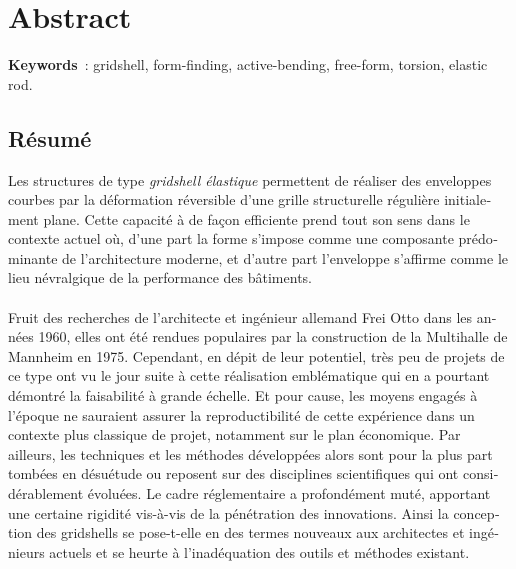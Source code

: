 
\cleardoublepage
\chapter*{Abstract}
\textbf{Keywords}~: gridshell, form-finding, active-bending, free-form, torsion, elastic rod.
\begin{otherlanguage}{french}
\cleardoublepage
\chapter*{Résumé}
Les structures de type \emph{gridshell élastique} permettent de réaliser des enveloppes courbes par la déformation réversible d'une grille structurelle régulière initialement plane. Cette capacité à  de façon efficiente prend tout son sens dans le contexte actuel où, d’une part la forme s'impose comme une composante prédominante de l'architecture moderne, et d’autre part l'enveloppe s'affirme comme le lieu névralgique de la performance des bâtiments.
\\
\\
Fruit des recherches de l'architecte et ingénieur allemand Frei Otto dans les années 1960, elles ont été rendues populaires par la construction de la Multihalle de Mannheim en 1975. Cependant, en dépit de leur potentiel, très peu de projets de ce type ont vu le jour suite à cette réalisation emblématique qui en a pourtant démontré la faisabilité à grande échelle. Et pour cause, les moyens engagés à l'époque ne sauraient assurer la reproductibilité de cette expérience dans un contexte plus classique de projet, notamment sur le plan économique. Par ailleurs, les techniques et les méthodes développées alors sont pour la plus part tombées en désuétude ou reposent sur des disciplines scientifiques qui ont considérablement évoluées. Le cadre réglementaire a profondément muté, apportant une certaine rigidité vis-à-vis de la pénétration des innovations. Ainsi la conception des gridshells se pose-t-elle en des termes nouveaux aux architectes et ingénieurs actuels et se heurte à l'inadéquation des outils et méthodes existant.

\end{otherlanguage}
